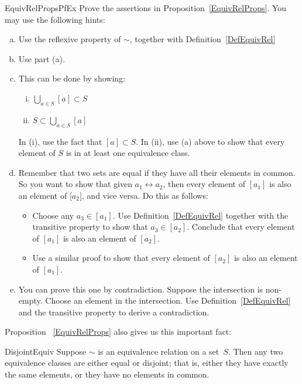\begin{exercise}{EquivRelPropsPfEx}
Prove the assertions in Proposition~\ref{EquivRelProps}. You may use the following hints:
\begin{enumerate}[(a)]
\item
Use the reflexive property of $\sim$, together with Definition~\ref{DefEquivRel}
\item
Use part (a).
\item
This can be done by showing:
\begin{enumerate}[(i)]
\item 
$\bigcup_{a \in S} [a] \subset S$
\item
$S \subset \bigcup_{a \in S} [a]$
\end{enumerate}
In (i), use the fact that $[a] \subset S$.  In (ii), use (a) above to show that every element of $S$ is in at least one equivalence class.
\item
Remember that two sets are equal if they have all their elements in common. So you want to show that given $a_1 \rel a_2$, then every element of $[a_1]$ is also an element of [$a_2]$, and vice versa. Do this as follows: 
\begin{itemize}
\item
Choose any $a_3 \in [a_1]$. Use Definition~\ref{DefEquivRel} together with the transitive property to show that $a_3 \in [a_2]$. Conclude that every element of $[a_1]$ is also an element of $[a_2]$. 
\item
Use a similar proof to show that every element of $[a_2]$ is also an element of $[a_1]$.
\end{itemize}
\item
You can prove this one by contradiction. Suppose the intersection is non-empty. Choose an element in the intersection. Use Definition~\ref{DefEquivRel} and the transitive property to derive a contradiction.
\end{enumerate}
\end{exercise}

Proposition~ \ref{EquivRelProps} also gives us this important fact:

\begin{prop}{DisjointEquiv}
Suppose $\sim$ is an equivalence relation on a set~$S$. Then any two equivalence classes are either equal or disjoint; that is, either they have exactly the same elements, or they have no elements in common. 
\end{prop}

